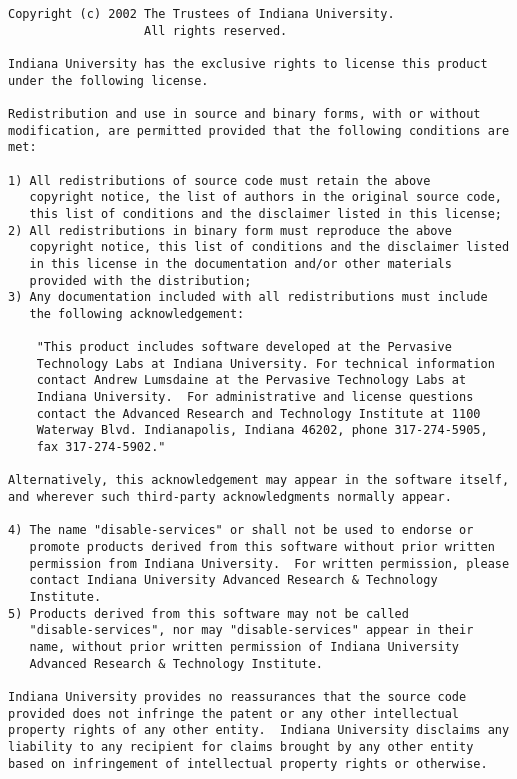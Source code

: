 \begin{verbatim}
Copyright (c) 2002 The Trustees of Indiana University.  
                   All rights reserved.

Indiana University has the exclusive rights to license this product
under the following license.

Redistribution and use in source and binary forms, with or without
modification, are permitted provided that the following conditions are
met:

1) All redistributions of source code must retain the above
   copyright notice, the list of authors in the original source code,
   this list of conditions and the disclaimer listed in this license; 
2) All redistributions in binary form must reproduce the above
   copyright notice, this list of conditions and the disclaimer listed
   in this license in the documentation and/or other materials
   provided with the distribution; 
3) Any documentation included with all redistributions must include
   the following acknowledgement:

    "This product includes software developed at the Pervasive
    Technology Labs at Indiana University. For technical information
    contact Andrew Lumsdaine at the Pervasive Technology Labs at
    Indiana University.  For administrative and license questions
    contact the Advanced Research and Technology Institute at 1100
    Waterway Blvd. Indianapolis, Indiana 46202, phone 317-274-5905,
    fax 317-274-5902."

Alternatively, this acknowledgement may appear in the software itself,
and wherever such third-party acknowledgments normally appear.

4) The name "disable-services" or shall not be used to endorse or
   promote products derived from this software without prior written
   permission from Indiana University.  For written permission, please
   contact Indiana University Advanced Research & Technology
   Institute.
5) Products derived from this software may not be called
   "disable-services", nor may "disable-services" appear in their
   name, without prior written permission of Indiana University
   Advanced Research & Technology Institute.

Indiana University provides no reassurances that the source code
provided does not infringe the patent or any other intellectual
property rights of any other entity.  Indiana University disclaims any
liability to any recipient for claims brought by any other entity
based on infringement of intellectual property rights or otherwise.


\end{verbatim}
